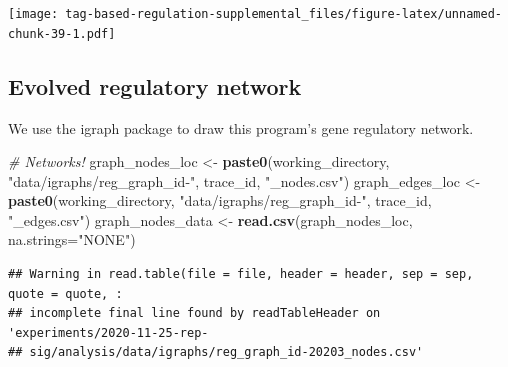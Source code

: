 \documentclass[
]{book}
\newenvironment{Shaded}{\begin{snugshade}}{\end{snugshade}}
\newcommand{\CommentTok}[1]{\textcolor[rgb]{0.56,0.35,0.01}{\textit{#1}}}
\newcommand{\DataTypeTok}[1]{\textcolor[rgb]{0.13,0.29,0.53}{#1}}
\newcommand{\KeywordTok}[1]{\textcolor[rgb]{0.13,0.29,0.53}{\textbf{#1}}}
\newcommand{\NormalTok}[1]{#1}
\newcommand{\StringTok}[1]{\textcolor[rgb]{0.31,0.60,0.02}{#1}}
\begin{document}
\texttt{[image: tag-based-regulation-supplemental\_files/figure-latex/unnamed-chunk-39-1.pdf]}

\hypertarget{evolved-regulatory-network}{%
\subsection{Evolved regulatory network}\label{evolved-regulatory-network}}

We use the igraph package to draw this program's gene regulatory network.

\begin{Shaded}
\begin{Highlighting}[]
\CommentTok{\# Networks!}
\NormalTok{graph\_nodes\_loc \textless{}{-}}\StringTok{ }\KeywordTok{paste0}\NormalTok{(working\_directory, }\StringTok{"data/igraphs/reg\_graph\_id{-}"}\NormalTok{, trace\_id, }\StringTok{"\_nodes.csv"}\NormalTok{)}
\NormalTok{graph\_edges\_loc \textless{}{-}}\StringTok{ }\KeywordTok{paste0}\NormalTok{(working\_directory, }\StringTok{"data/igraphs/reg\_graph\_id{-}"}\NormalTok{, trace\_id, }\StringTok{"\_edges.csv"}\NormalTok{)}
\NormalTok{graph\_nodes\_data \textless{}{-}}\StringTok{ }\KeywordTok{read.csv}\NormalTok{(graph\_nodes\_loc, }\DataTypeTok{na.strings=}\StringTok{"NONE"}\NormalTok{)}
\end{Highlighting}
\end{Shaded}

\begin{verbatim}
## Warning in read.table(file = file, header = header, sep = sep, quote = quote, :
## incomplete final line found by readTableHeader on 'experiments/2020-11-25-rep-
## sig/analysis/data/igraphs/reg_graph_id-20203_nodes.csv'
\end{verbatim}
\end{document}
